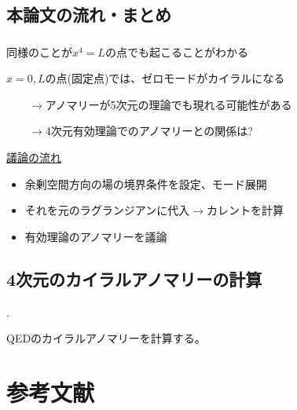 \documentclass[
  unicode,a4paper,10pt,
  xcolor = {dvipsnames,svgnames},
  hyperref ={colorlinks=true,citecolor=Navy,linkcolor=NavyBlue,urlcolor=purple},
  ja=standard,lualatex
]{beamer}
\begin{document}
\subsection{本論文の流れ・まとめ}

\begin{frame}
  \frametitle{\subsecname}

  同様のことが$x^{4}=L$の点でも起こることがわかる

  \vspace*{5pt}

  $x=0,L$の点(固定点)では、ゼロモードがカイラルになる

  $\qquad\rightarrow$アノマリーが5次元の理論でも現れる可能性がある

  $\qquad\rightarrow$4次元有効理論でのアノマリーとの関係は?

  \pause
  \vspace*{5pt}

  \uline{議論の流れ}

  \begin{itemize}
    \item 
    余剰空間方向の場の境界条件を設定、モード展開
    \item 
    それを元のラグランジアンに代入$\rightarrow$カレントを計算
    \item 
    有効理論のアノマリーを議論
  \end{itemize}

\end{frame}


\subsection{4次元のカイラルアノマリーの計算}


\begin{frame}{\thesubsection. \subsecname}

  QEDのカイラルアノマリーを計算する。
  

\end{frame}


\section{参考文献}
\begin{frame}{\secname}

  \scriptsize
  \beamertemplatetextbibitems
  
  

  \nocite{Fujikawa:2001a}
  \nocite{Fujikawa:2001b}
  \nocite{Choi:2020dws}

\end{frame}

\setcounter{framenumber}{\value{Appendix}}
\end{document}
